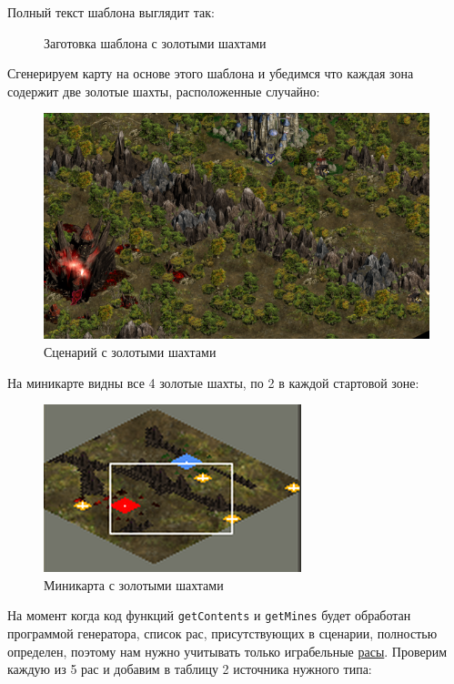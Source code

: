 Полный текст шаблона выглядит так:

\begin{figure}[H]

\caption{Заготовка шаблона с золотыми шахтами}
\end{figure}

Сгенерируем карту на основе этого шаблона и убедимся что каждая зона содержит две золотые шахты, расположенные случайно:

\begin{figure}[H]
\center
\includegraphics[width=1.0\linewidth]{docImages/scenarioWithMines.png}
\caption{Сценарий с золотыми шахтами}
\end{figure}

На миникарте видны все 4 золотые шахты, по 2 в каждой стартовой зоне:

\begin{figure}[H]
\center
\includegraphics[width=.48\linewidth]{docImages/scenarioMinimapWithMines.png}
\caption{Миникарта с золотыми шахтами}
\end{figure}

На момент когда код функций \texttt{getContents} и \texttt{getMines} будет обработан программой генератора, список рас, присутствующих в сценарии, полностью определен, поэтому нам нужно учитывать только играбельные \hyperref[raceTypes]{расы}. Проверим каждую из 5 рас и добавим в таблицу 2 источника нужного типа:

